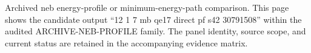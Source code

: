 Archived neb energy-profile or minimum-energy-path comparison. This page shows the candidate output ``12 1 7 mb qe17 direct pf s42 30791508'' within the audited ARCHIVE-NEB-PROFILE family. The panel identity, source scope, and current status are retained in the accompanying evidence matrix.
